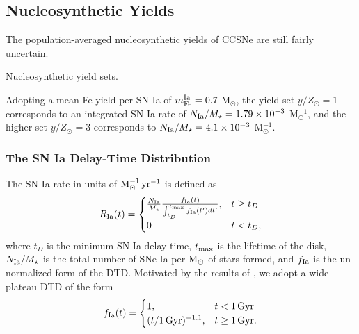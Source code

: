 \documentclass[twocolumn,twocolappendix,linenumbers]{aastex631}
\newcommand{\aFe}{[$\alpha$/Fe]\xspace}
\begin{document}
\subsection{Nucleosynthetic Yields}
\label{sec:yields}

The population-averaged nucleosynthetic yields of CCSNe are still fairly uncertain. 

\begin{table}
    \centering
    \caption{Nucleosynthetic yield sets.}
    \label{tab:yields}
    
\end{table}

Adopting a mean Fe yield per SN Ia of $m_{\rm Fe}^{\rm Ia}=0.7$ M$_\odot$, the yield set $y/Z_\odot=1$ corresponds to an integrated SN Ia rate of $N_{\rm Ia}/M_\star=\num{1.79e-3}$ M$_\odot^{-1}$, and the higher set $y/Z_\odot=3$ corresponds to $N_{\rm Ia}/M_\star=\num{4.1e-3}$ M$_\odot^{-1}$.

\subsubsection{The SN Ia Delay-Time Distribution}
\label{sec:dtd}

The SN Ia rate in units of ${\rm M}_\odot^{-1}\,{\rm yr}^{-1}$ is defined as
\begin{equation}
    R_{\rm Ia}(t) = 
    \begin{cases}
        \frac{N_{\rm Ia}}{M_\star}
        \frac{f_{\rm Ia}(t)}{\int_{t_D}^{t_{\rm max}} f_{\rm Ia}(t') dt'}, & t \ge t_D \\
        0 & t < t_D,
    \end{cases}
    \label{eq:dtd-function}
\end{equation}
where $t_D$ is the minimum SN Ia delay time, $t_{\rm max}$ is the lifetime of the disk, $N_{\rm Ia}/M_\star$ is the total number of SNe Ia per ${\rm M}_\odot$ of stars formed, and $f_{\rm Ia}$ is the un-normalized form of the DTD. Motivated by the results of \citet{dubay_galactic_2024}, we adopt a wide plateau DTD of the form
\begin{equation}
    \label{eq:plateau-dtd}
    f_{\rm Ia}(t) =
    \begin{cases}
        1, & t < 1\,{\rm Gyr} \\
        (t/1\,{\rm Gyr})^{-1.1}, & t \ge 1\,{\rm Gyr}.
    \end{cases}
\end{equation}
\end{document}
